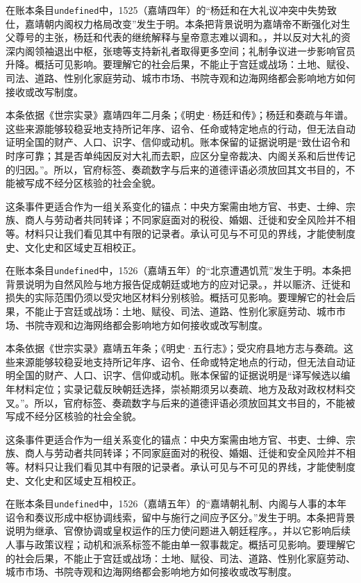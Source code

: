 在账本条目\texttt{undefined}中，1525（嘉靖四年）的“杨廷和在大礼议冲突中失势致仕，嘉靖朝内阁权力格局改变”发生于明。本条把背景说明为嘉靖帝不断强化对生父尊号的主张，杨廷和代表的继统解释与皇帝意志难以调和。，并以反对大礼的资深内阁领袖退出中枢，张璁等支持新礼者取得更多空间；礼制争议进一步影响官员升降。概括可见影响。要理解它的社会后果，不能止于宫廷或战场：土地、赋役、司法、道路、性别化家庭劳动、城市市场、书院寺观和边海网络都会影响地方如何接收或改写制度。

本条依据《世宗实录》嘉靖四年二月条；《明史·杨廷和传》；杨廷和奏疏与年谱。这些来源能够较稳妥地支持所记年序、诏令、任命或特定地点的行动，但无法自动证明全国的财产、人口、识字、信仰或动机。账本保留的证据说明是“致仕诏令和时序可靠；其是否单纯因反对大礼而去职，应区分皇帝裁决、内阁关系和后世传记的归因。”。所以，官府标签、奏疏数字与后来的道德评语必须放回其文书目的，不能被写成不经分区核验的社会全貌。

这条事件更适合作为一组关系变化的锚点：中央方案需由地方官、书吏、士绅、宗族、商人与劳动者共同转译；不同家庭面对的税役、婚姻、迁徙和安全风险并不相等。材料只让我们看见其中有限的记录者。承认可见与不可见的界线，才能使制度史、文化史和区域史互相校正。

在账本条目\texttt{undefined}中，1526（嘉靖五年）的“北京遭遇饥荒”发生于明。本条把背景说明为自然风险与地方报告促成朝廷或地方的应对记录。，并以赈济、迁徙和损失的实际范围仍须以受灾地区材料分别核验。概括可见影响。要理解它的社会后果，不能止于宫廷或战场：土地、赋役、司法、道路、性别化家庭劳动、城市市场、书院寺观和边海网络都会影响地方如何接收或改写制度。

本条依据《世宗实录》嘉靖五年条；《明史·五行志》；受灾府县地方志与奏疏。这些来源能够较稳妥地支持所记年序、诏令、任命或特定地点的行动，但无法自动证明全国的财产、人口、识字、信仰或动机。账本保留的证据说明是“译写候选以编年材料定位；实录记载反映朝廷选择，崇祯期须另以奏疏、地方及敌对政权材料交叉。”。所以，官府标签、奏疏数字与后来的道德评语必须放回其文书目的，不能被写成不经分区核验的社会全貌。

这条事件更适合作为一组关系变化的锚点：中央方案需由地方官、书吏、士绅、宗族、商人与劳动者共同转译；不同家庭面对的税役、婚姻、迁徙和安全风险并不相等。材料只让我们看见其中有限的记录者。承认可见与不可见的界线，才能使制度史、文化史和区域史互相校正。

在账本条目\texttt{undefined}中，1526（嘉靖五年）的“嘉靖朝礼制、内阁与人事的本年诏令和奏议形成中枢协调线索，留中与施行之间应予区分。”发生于明。本条把背景说明为继承、官僚协调或皇权运作的压力使问题进入朝廷程序。，并以它影响后续人事与政策议程；动机和派系标签不能由单一叙事裁定。概括可见影响。要理解它的社会后果，不能止于宫廷或战场：土地、赋役、司法、道路、性别化家庭劳动、城市市场、书院寺观和边海网络都会影响地方如何接收或改写制度。

